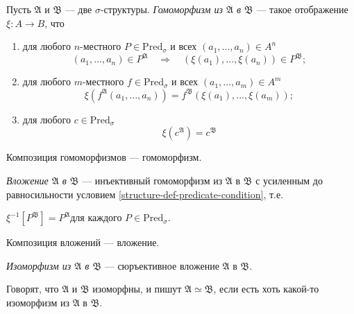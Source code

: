 \documentclass[12pt,a4paper]{article}
\newcommand{\Pred}{\ensuremath{\mathrm{Pred}}\xspace}
\begin{document}
    \begin{definition}
        Пусть $\mathfrak{A}$ и $\mathfrak{B}$ --- две $\sigma$-структуры. \emph{Гомоморфизм из $\mathfrak{A}$ в $\mathfrak{B}$} --- такое отображение $\xi: A \to B$, что
        \begin{enumerate}
            \item \label{structure-def-predicate-condition} для любого $n$-местного $P \in \Pred_\sigma$ и всех $(a_1, \dots, a_n) \in A^n$
                \[
                    (a_1, \dots, a_n) \in P^\mathfrak{A}
                    \quad \Longrightarrow \quad
                    (\xi(a_1), \dots, \xi(a_n)) \in P^\mathfrak{B};
                \]
            \item для любого $m$-местного $f \in \Pred_\sigma$ и всех $(a_1, \dots, a_m) \in A^m$
                \[
                    \xi(f^\mathfrak{A}(a_1, \dots, a_n)) = f^\mathfrak{B}(\xi(a_1), \dots, \xi(a_m));
                \]
            \item для любого $c \in \Pred_\sigma$
                \[
                    \xi(c^\mathfrak{A}) = c^\mathfrak{B}
                \]
        \end{enumerate}
    \end{definition}

    \begin{lemma}
        Композиция гомоморфизмов --- гомоморфизм.
    \end{lemma}

    \begin{definition}
        \emph{Вложение $\mathfrak{A}$ в $\mathfrak{B}$} --- инъективный гомоморфизм из $\mathfrak{A}$ в $\mathfrak{B}$ с усиленным до равносильности условием \ref{structure-def-predicate-condition}, т.е.
        \begin{center}
            $\xi^{-1}[P^\mathfrak{B}] = P^\mathfrak{A}$\quad для каждого $P \in \Pred_\sigma$.
        \end{center}
    \end{definition}

    \begin{lemma}
        Композиция вложений --- вложение.
    \end{lemma}

    \begin{definition}
        \emph{Изоморфизм из $\mathfrak{A}$ в $\mathfrak{B}$} --- сюръективное вложение $\mathfrak{A}$ в $\mathfrak{B}$.

        Говорят, что $\mathfrak{A}$ и $\mathfrak{B}$ изоморфны, и пишут $\mathfrak{A} \simeq \mathfrak{B}$, если есть хоть какой-то изоморфизм из $\mathfrak{A}$ в $\mathfrak{B}$.
    \end{definition}
\end{document}
